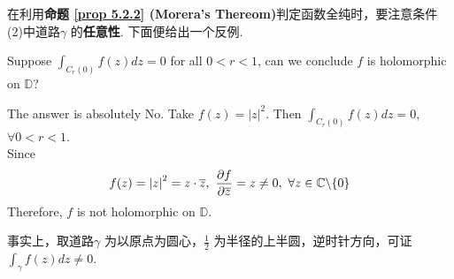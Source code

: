 	\vspace{2em}
	在利用\textbf{命题 \ref{prop 5.2.2} (Morera's Thereom)}判定函数全纯时，要注意条件 (2)中道路$\gamma$ 的\textbf{任意性}. 下面便给出一个反例.
	\begin{example}\label{ex 5.2.1}
		Suppose $\int_{C_{r}(0)}{f(z) dz} = 0$ for all $0 < r < 1$, can we conclude $f$ is holomorphic on $\mathbb{D}$?
		
		\vspace{2em}
		\begin{solution}
			The answer is absolutely No. Take $f(z) = \left| z \right|^2$. Then $\int_{C_{r}(0)}{f(z) dz} = 0$, $\forall 0 < r < 1$. \\
			Since
			\begin{align}
				f(z) = \left| z \right|^2 = z \cdot \overline{z} , \,\, \frac{\partial f}{\partial \overline{z}} = z \neq 0 , \,\, \forall z \in \mathbb{C} \backslash \{ 0 \}
			\end{align}
			Therefore, $f$ is not holomorphic on $\mathbb{D}$.
			
			\begin{rmk}
				事实上，取道路$\gamma$ 为以原点为圆心，$\frac{1}{2}$ 为半径的上半圆，逆时针方向，可证$\int_{\gamma}{f(z) dz} \neq 0$.
			\end{rmk}
		\end{solution}
	\end{example}


	



\newpage
